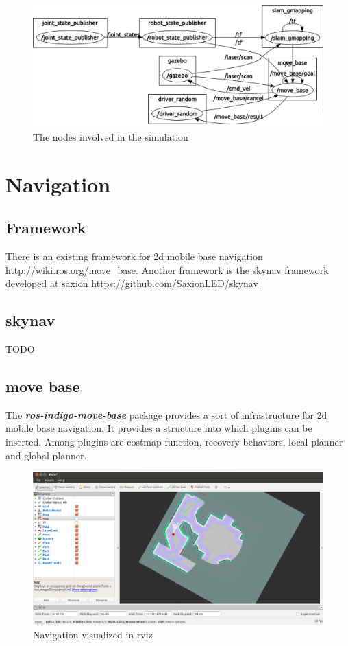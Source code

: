 \documentclass[a4paper]{article}
\newcommand{\rospackage}[1]{\textbf{\textit{#1}}}
\begin{document}
\begin{figure}[h!]
  \includegraphics[width=\textwidth,height=\textheight,keepaspectratio]{img/simulatie_nodes.png}
  \caption{The nodes involved in the simulation}
\end{figure}

\section{Navigation}

\subsection{Framework}

There is an existing framework for 2d mobile base navigation \url{http://wiki.ros.org/move_base}.
Another framework is the skynav framework developed at saxion \url{https://github.com/SaxionLED/skynav}

\subsection{skynav}
TODO

\subsection{move base}

The \rospackage{ros-indigo-move-base} package provides a sort of infrastructure for 2d mobile base
navigation. It provides a structure into which plugins can be inserted.
Among plugins are costmap function, recovery behaviors, local planner and global planner.

\begin{figure}[h!]
  \includegraphics[width=\textwidth,height=\textheight,keepaspectratio]{img/rviz_navigation2.png}
  \caption{Navigation visualized in rviz}
  \label{fig:navrviz}
\end{figure}
\end{document}
